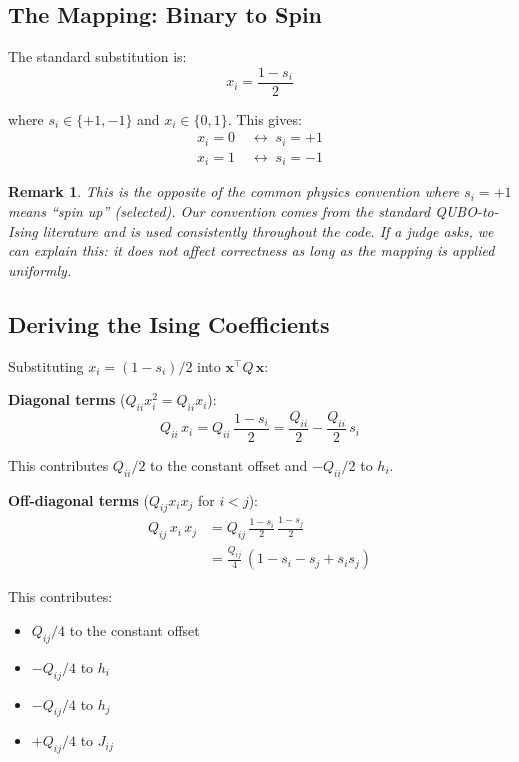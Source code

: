 \documentclass[12pt, a4paper]{article}
\newtheorem{remark}{Remark}[section]
\begin{document}
\subsection{The Mapping: Binary to Spin}

The standard substitution is:
\begin{equation}
x_i = \frac{1 - s_i}{2}
\label{eq:bit_to_spin}
\end{equation}

where $s_i \in \{+1, -1\}$ and $x_i \in \{0, 1\}$. This gives:
\begin{align}
x_i = 0 &\;\longleftrightarrow\; s_i = +1 \\
x_i = 1 &\;\longleftrightarrow\; s_i = -1
\end{align}

\begin{remark}
This is the \textit{opposite} of the common physics convention where
$s_i = +1$ means ``spin up'' (selected). Our convention comes from the
standard QUBO-to-Ising literature and is used consistently throughout the
code. If a judge asks, we can explain this: it does not affect correctness
as long as the mapping is applied uniformly.
\end{remark}

\subsection{Deriving the Ising Coefficients}

Substituting $x_i = (1 - s_i)/2$ into $\mathbf{x}^\top Q\,\mathbf{x}$:

\textbf{Diagonal terms} ($Q_{ii} x_i^2 = Q_{ii} x_i$):
\[
Q_{ii}\, x_i = Q_{ii}\, \frac{1 - s_i}{2} = \frac{Q_{ii}}{2} - \frac{Q_{ii}}{2}\, s_i
\]

This contributes $Q_{ii}/2$ to the constant offset and $-Q_{ii}/2$ to $h_i$.

\textbf{Off-diagonal terms} ($Q_{ij} x_i x_j$ for $i < j$):
\begin{align}
Q_{ij}\, x_i\, x_j
&= Q_{ij}\, \frac{1 - s_i}{2}\, \frac{1 - s_j}{2} \\
&= \frac{Q_{ij}}{4}\, (1 - s_i - s_j + s_i s_j)
\end{align}

This contributes:
\begin{itemize}
    \item $Q_{ij}/4$ to the constant offset
    \item $-Q_{ij}/4$ to $h_i$
    \item $-Q_{ij}/4$ to $h_j$
    \item $+Q_{ij}/4$ to $J_{ij}$
\end{itemize}
\end{document}
